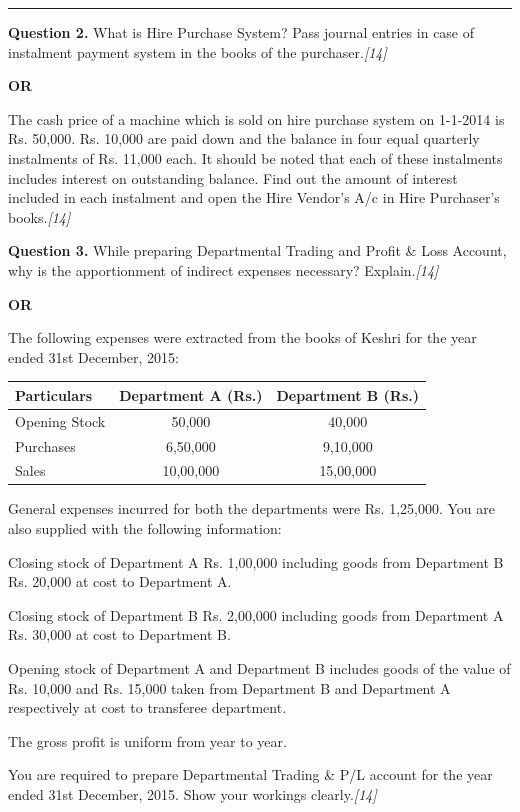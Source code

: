 \documentclass[11pt,a4paper]{article}
\newcommand{\pts}[1]{\hfill   \textit{[#1]}}
\begin{document}
\medskip\rule{\linewidth}{0.2pt}




\noindent   \textbf{Question 2.}
What is Hire Purchase System? Pass journal entries in case of instalment payment system in the books of the purchaser.\pts{14}

\centerline{   \textbf{OR}}

The cash price of a machine which is sold on hire purchase system on 1-1-2014 is Rs. 50,000. Rs. 10,000 are paid down and the balance in four equal quarterly instalments of Rs. 11,000 each. It should be noted that each of these instalments includes interest on outstanding balance. Find out the amount of interest included in each instalment and open the Hire Vendor's A/c in Hire Purchaser's books.\pts{14}

\pagebreak




\noindent   \textbf{Question 3.}
While preparing Departmental Trading and Profit \& Loss Account, why is the apportionment of indirect expenses necessary? Explain.\pts{14}

\centerline{   \textbf{OR}}

The following expenses were extracted from the books of Keshri for the year ended 31st December, 2015:


\begin{center}
\small

\begin{tabular}{|l|c|c|}
\hline
   \textbf{Particulars} &   \textbf{Department A (Rs.)} &   \textbf{Department B (Rs.)} \\
\hline
Opening Stock & 50,000 & 40,000 \\
Purchases & 6,50,000 & 9,10,000 \\
Sales & 10,00,000 & 15,00,000 \\
\hline
\end{tabular}
\end{center}

General expenses incurred for both the departments were Rs. 1,25,000. You are also supplied with the following information:

\begin{parts}
  \item Closing stock of Department A Rs. 1,00,000 including goods from Department B Rs. 20,000 at cost to Department A.
  \item Closing stock of Department B Rs. 2,00,000 including goods from Department A Rs. 30,000 at cost to Department B.
  \item Opening stock of Department A and Department B includes goods of the value of Rs. 10,000 and Rs. 15,000 taken from Department B and Department A respectively at cost to transferee department.
  \item The gross profit is uniform from year to year.
\end{parts}
You are required to prepare Departmental Trading \& P/L account for the year ended 31st December, 2015. Show your workings clearly.\pts{14}
\end{document}

